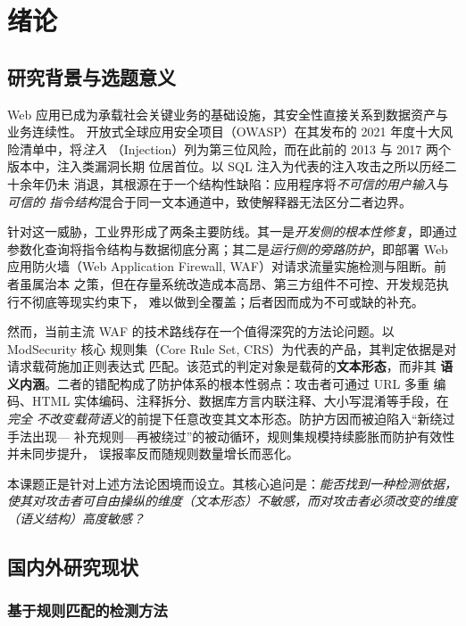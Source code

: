 \section{绪论}
\label{sec:intro}

\subsection{研究背景与选题意义}

Web 应用已成为承载社会关键业务的基础设施，其安全性直接关系到数据资产与业务连续性。
开放式全球应用安全项目（OWASP）在其发布的 2021 年度十大风险清单中，将\emph{注入}
（Injection）列为第三位风险，而在此前的 2013 与 2017 两个版本中，注入类漏洞长期
位居首位\cite{owasp2021top10}。以 SQL 注入为代表的注入攻击之所以历经二十余年仍未
消退，其根源在于一个结构性缺陷：应用程序将\emph{不可信的用户输入}与\emph{可信的
指令结构}混合于同一文本通道中，致使解释器无法区分二者边界。

针对这一威胁，工业界形成了两条主要防线。其一是\emph{开发侧的根本性修复}，即通过
参数化查询将指令结构与数据彻底分离；其二是\emph{运行侧的旁路防护}，即部署 Web
应用防火墙（Web Application Firewall, WAF）对请求流量实施检测与阻断。前者虽属治本
之策，但在存量系统改造成本高昂、第三方组件不可控、开发规范执行不彻底等现实约束下，
难以做到全覆盖；后者因而成为不可或缺的补充。

然而，当前主流 WAF 的技术路线存在一个值得深究的方法论问题。以 ModSecurity 核心
规则集（Core Rule Set, CRS）为代表的产品，其判定依据是对请求载荷施加正则表达式
匹配\cite{owasp2023crs}。该范式的判定对象是载荷的\textbf{文本形态}，而非其
\textbf{语义内涵}。二者的错配构成了防护体系的根本性弱点：攻击者可通过 URL 多重
编码、HTML 实体编码、注释拆分、数据库方言内联注释、大小写混淆等手段，在\emph{完全
不改变载荷语义}的前提下任意改变其文本形态。防护方因而被迫陷入“新绕过手法出现—
补充规则—再被绕过”的被动循环，规则集规模持续膨胀而防护有效性并未同步提升，
误报率反而随规则数量增长而恶化。

本课题正是针对上述方法论困境而设立。其核心追问是：\emph{能否找到一种检测依据，
使其对攻击者可自由操纵的维度（文本形态）不敏感，而对攻击者必须改变的维度
（语义结构）高度敏感？}

\subsection{国内外研究现状}

\subsubsection{基于规则匹配的检测方法}

